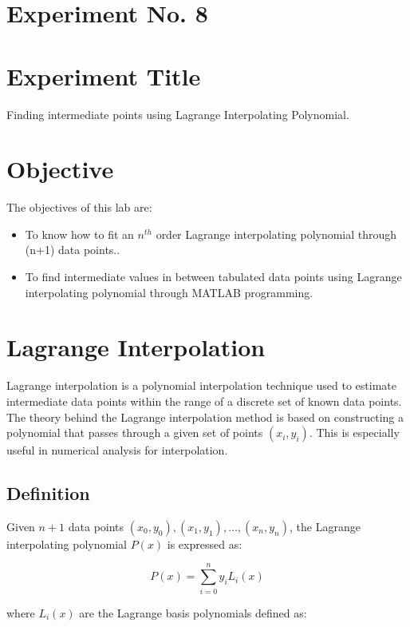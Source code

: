 \documentclass[a4paper,12pt]{article}
\begin{document}
	\section{Experiment No. 8}
	
	\section{Experiment Title }
Finding intermediate points using Lagrange Interpolating Polynomial.
	\section{Objective}
	
	The objectives of this lab are:
	\begin{itemize}
		\item To know how to fit an $n^{th}$ order Lagrange interpolating polynomial through (n+1) data points..
		\item To find intermediate values in between tabulated data points using Lagrange interpolating polynomial through MATLAB programming.
		
	\end{itemize}
	
	\section{Lagrange Interpolation}
	
	Lagrange interpolation is a polynomial interpolation technique used to estimate intermediate data points within the range of a discrete set of known data points. The theory behind the Lagrange interpolation method is based on constructing a polynomial that passes through a given set of points $(x_i, y_i)$. This is especially useful in numerical analysis for interpolation.
	
	\subsection{ Definition}
	
	Given $n+1$ data points $(x_0, y_0), (x_1, y_1), \ldots, (x_n, y_n)$, the Lagrange interpolating polynomial $P(x)$ is expressed as:
	
	\begin{equation}
		P(x) = \sum_{i=0}^{n} y_i L_i(x)
		\label{eq:lagrange_poly}
	\end{equation}
	
	where $L_i(x)$ are the Lagrange basis polynomials defined as:
	
\end{document}
